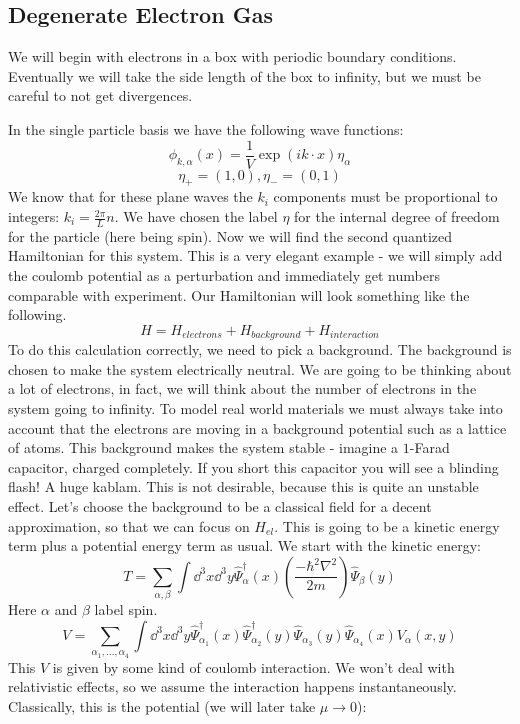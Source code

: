 \documentclass{article}
\begin{document}
\subsection{Degenerate Electron Gas}
We will begin with electrons in a box with periodic boundary conditions. Eventually we will take the side length of the box to infinity, but we must be careful to not get divergences.

In the single particle basis we have the following wave functions:
\[\phi_{k,\alpha}(x)=\frac{1}{V}\exp\left(ik\cdot x\right)\eta_\alpha\]
\[\eta_+ = (1,0), \eta_-=(0,1)\]
We know that for these plane waves the $k_i$ components must be proportional to integers: $k_i =\frac{2\pi}{L}n$. We have chosen the label $\eta$ for the internal degree of freedom for the particle (here being spin). Now we will find the second quantized Hamiltonian for this system. This is a very elegant example - we will simply add the coulomb potential as a perturbation and immediately get numbers comparable with experiment. Our Hamiltonian will look something like the following.
\begin{equation}
    H = H_{electrons}+H_{background}+H_{interaction}
\end{equation}
To do this calculation correctly, we need to pick a background. The background is chosen to make the system electrically neutral. We are going to be thinking about a lot of electrons, in fact, we will think about the number of electrons in the system going to infinity. To model real world materials we must always take into account that the electrons are moving in a background potential such as a lattice of atoms. This background makes the system stable - imagine a $1$-Farad capacitor, charged completely. If you short this capacitor you will see a blinding flash! A huge kablam. This is not desirable, because this is quite an unstable effect. Let's choose the background to be a classical field for a decent approximation, so that we can focus on $H_{el}$. This is going to be a kinetic energy term plus a potential energy term as usual. We start with the kinetic energy:
\[T = \sum_{\alpha, \beta}\int \dd^3 x \dd^3 y \hat\Psi^\dagger_\alpha(x)\left(\frac{-\hbar^2\nabla^2}{2m}\right)\hat\Psi_\beta(y)\]
Here $\alpha$ and $\beta$ label spin.
\[V = \sum_{\alpha_1,...,\alpha_4}\int \dd^3 x\dd^3 y \hat\Psi_{\alpha_1}^\dagger(x)\hat\Psi_{\alpha_2}^\dagger(y)\hat\Psi_{\alpha_3}(y)\hat\Psi_{\alpha_4}(x)V_{\alpha}(x,y)\]
This $V$ is given by some kind of coulomb interaction. We won't deal with relativistic effects, so we assume the interaction happens instantaneously. Classically, this is the potential (we will later take $\mu \to 0$):
\end{document}
